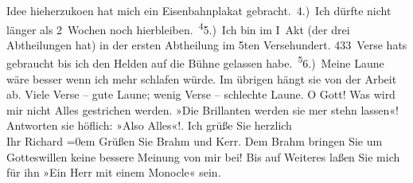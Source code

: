 \begin{ledgroupsized}[t]{13cm}
               Idee hieherzuko{\geminationm}en hat mich ein Eisenbahnplakat
               gebracht. 4.) Ich dürfte nicht länger als 2 Wochen noch hierbleiben. \substVorne{}\textsuperscript{4}\substDazwischen{}5\substHinten{}.) Ich bin im I Akt
               (der drei Abtheilungen hat) in der ersten Abtheilung im 5ten Versehundert. 433 Verse hats gebraucht bis
               ich den Helden auf die Bühne gelassen habe. \substVorne{}\textsuperscript{5}\substDazwischen{}6\substHinten{}.) Meine Laune wäre besser {\pb}wenn ich mehr schlafen würde. Im übrigen hängt sie von der Arbeit ab. Viele Verse –
               gute Laune; wenig Verse – schlechte Laune. O Gott! Was wird mir nicht Alles
               gestrichen werden. »Die Brillanten werden sie mer stehn lassen«! Antworten sie
               höflich: »Also Alles«!.\pend
           \pstart
            Ich grüße Sie herzlich{\\[\baselineskip]}Ihr \spacefill\mbox{Richard}\pend
           \leftskip=0em{}\pstart
           \noindent{}Grüßen Sie Brahm und Kerr. Dem Brahm bringen Sie um Gotteswillen keine
                  bessere Meinung von mir bei! Bis auf Weiteres laßen Sie mich für ihn »Ein Herr mit
                  einem Monocle« sein.\pend
           
         
         \endnumbering{}\end{ledgroupsized}  \newcommand{\dateiname}{L00988}\newcommand{\titel}{Richard Beer-Hofmann an Arthur Schnitzler, 3. 10. 1899}\newcommand{\editorInnen}{Martin Anton Müller und Gerd-Hermann Susen}
      